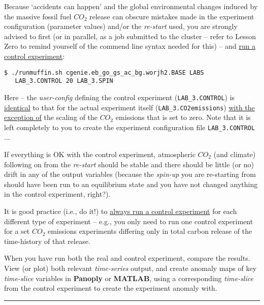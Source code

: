 \documentclass[11pt,fleqn]{book} %
\begin{document}
\noindent Because ‘accidents can happen’ and the global environmental changes induced by the massive fossil fuel \(CO_{2}\) release can obscure mistakes made in the experiment configuration (parameter values) and/or the \textit{re-start} used, you are strongly advised to first (or in parallel, as a job submitted to the cluster – refer to Lesson Zero to remind yourself of the commend line syntax needed for this) --  and \uline{run a control experiment}:
\vspace{-2pt}\begin{verbatim}
$ ./runmuffin.sh cgenie.eb_go_gs_ac_bg.worjh2.BASE LABS
   LAB_3.CONTROL 20 LAB_3.SPIN
\end{verbatim}\vspace{-2pt}
Here – the \textit{user-config} defining the control experiment (\texttt{LAB\_3.CONTROL}) is \uline{identical} to that for the actual experiment itself (\texttt{LAB\_3.CO2emissions}) \uline{with the exception of} the scaling of the \(CO_{2}\) emissions that is set to zero. Note that it is left completely to you to create the experiment configuration file \texttt{LAB\_3.CONTROL} ...

If everything is OK with the control experiment, atmospheric \(CO_{2}\) (and climate) following on from the \textit{re-start} should be stable and there should be little (or no) drift in any of the output variables (because the \textit{spin-up} you are re-starting from should have been run to an equilibrium state and you have not changed anything in the control experiment, right?).

It is good practice (i.e., do it!) to \uline{always run a control experiment} for each different type of experiment – e.g., you only need to run one control experiment for a set \(CO_{2}\) emissions experiments differing only in total carbon release of the time-history of that release.

When you have run both the real and control experiment, compare the results. View (or plot) both relevant \textit{time-series} output, and create anomaly maps of key \textit{time-slice} variables in \textbf{Panoply} or \textbf{MATLAB}, using a corresponding \textit{time-slice} from the control experiment to create the experiment anomaly with.

\vspace{1mm}
\noindent\rule{4cm}{0.1mm}
\vspace{2mm}
\end{document}
